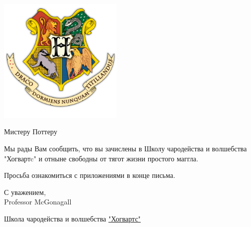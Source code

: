 \documentclass[12pt, a4paper]{article}
\begin{document}
 
\fontsize{14}{1}\selectfont

\begin{center}
\includegraphics[height=6cm]{Hogwarts.png}
\end{center}

\vspace{1cm}

{ \fontsize{12}{1.33}\selectfont Мистеру Поттеру}

\vspace{2.5cm}

Мы рады Вам сообщить, что вы зачислены в Школу чародейства и волшебства "Хогвартc" и отныне свободны от тягот жизни простого маггла.

Просьба ознакомиться с приложениями в конце письма.

С уважением,\\
{\weva Professor McGonagall}

\vfill

\parbox[b]{20cm}{\centering\small Школа чародейства и волшебства \href{https://www.pottermore.com/explore-the-story/hogwarts}{"Хогвартс"}}
\end{document}
